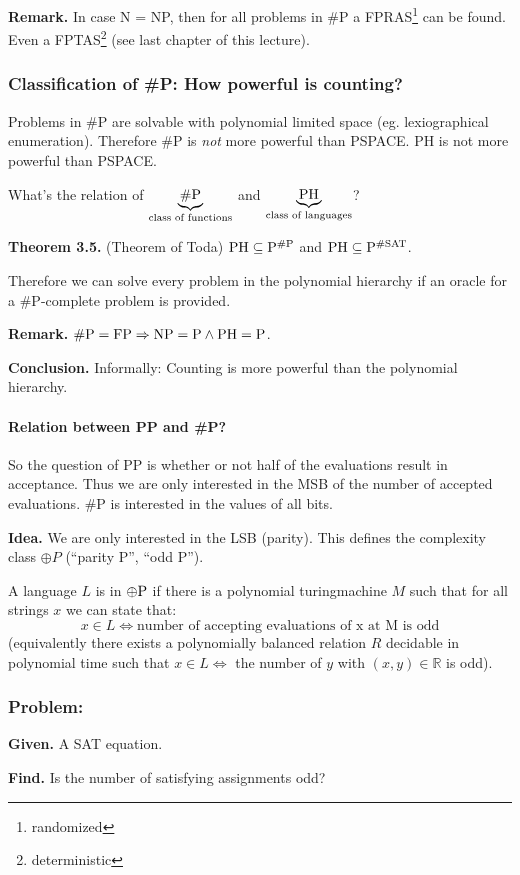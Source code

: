 \documentclass[a4paper]{article}
\newcommand{\given}[1]{\textbf{Given.} #1\par}
\newcommand{\find}[1]{\textbf{Find.} #1\par}
\newcommand{\cls}[1]{\rm{#1}}
\newcommand{\probl}[1]{\text{\textsc{#1}}}
\newenvironment{spec}[0]{\begin{framed}}{\end{framed}}
\begin{document}
\textbf{Remark.}
In case N = \cls{NP}, then for all problems in \cls{\#P} a \cls{FP}RAS\footnote{randomized}
can be found. Even a \cls{FPTAS}\footnote{deterministic}
(see last chapter of this lecture).

\subsubsection{Classification of \cls{\#P}: How powerful is counting?}
%
Problems in \cls{\#P} are solvable with polynomial limited space
(eg. lexiographical enumeration). Therefore \cls{\#P} is \emph{not}
more powerful than PSPACE. PH is not more powerful than PSPACE.

What's the relation of $\underbrace{\cls{\#P}}_{\text{class of functions}}$
and $\underbrace{\cls{PH}}_{\text{class of languages}}$?

\textbf{Theorem 3.5.} (Theorem of Toda) $\cls{PH} \subseteq P^{\cls{\#P}}$ and
  $\cls{PH} \subseteq P^{\cls{\#SAT}}$.

Therefore we can solve every problem in the polynomial hierarchy
if an oracle for a \cls{\#P}-complete problem is provided.

\textbf{Remark.}
  $\cls{\#P} = \cls{FP} \Rightarrow \cls{NP} = \cls{P} \land \cls{PH} = \cls{P}$.

\textbf{Conclusion.}
  Informally: Counting is more powerful than the polynomial hierarchy.

\paragraph{Relation between PP and \cls{\#P}?}
  So the question of PP is whether or not half of the evaluations result
  in acceptance. Thus we are only interested in the MSB of the number of
  accepted evaluations. \cls{\#P} is interested in the values of all bits.

\textbf{Idea.}
  We are only interested in the LSB (parity). This defines the complexity class
  $\oplus P$ (``parity P'', ``odd P'').

A language $L$ is in $\cls{\oplus P}$ if there is a polynomial turingmachine
$M$ such that for all strings $x$ we can state that:
\[
  x \in L \Leftrightarrow \text{number of accepting evaluations of x at M is odd}
\]
(equivalently there exists a polynomially balanced relation $R$
decidable in polynomial time such that $x \in L \Leftrightarrow$ the number of $y$
with $(x, y) \in \mathbb{R}$ is odd).

\subsubsection{Problem: \probl{$\oplus$ SAT}}
%
\begin{spec}
  \given{A SAT equation.}
  \find{Is the number of satisfying assignments odd?} %
\end{spec}
\end{document}
